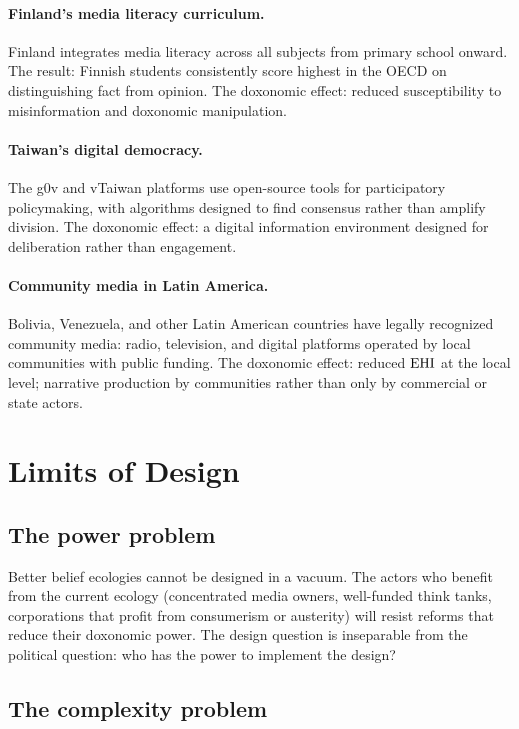 \paragraph{Finland's media literacy curriculum.}
Finland integrates media literacy across all subjects from primary school onward.
The result: Finnish students consistently score highest in the OECD on distinguishing fact from opinion.
The doxonomic effect: reduced susceptibility to misinformation and doxonomic manipulation.

\paragraph{Taiwan's digital democracy.}
The g0v and vTaiwan platforms use open-source tools for participatory policymaking, with algorithms designed to find consensus rather than amplify division.
The doxonomic effect: a digital information environment designed for deliberation rather than engagement.

\paragraph{Community media in Latin America.}
Bolivia, Venezuela, and other Latin American countries have legally recognized community media: radio, television, and digital platforms operated by local communities with public funding.
The doxonomic effect: reduced $\mathrm{EHI}$ at the local level; narrative production by communities rather than only by commercial or state actors.

\section{Limits of Design}
\label{sec:ch33-limits}

\subsection{The power problem}

Better belief ecologies cannot be designed in a vacuum.
The actors who benefit from the current ecology (concentrated media owners, well-funded think tanks, corporations that profit from consumerism or austerity) will resist reforms that reduce their doxonomic power.
The design question is inseparable from the political question: who has the power to implement the design?

\subsection{The complexity problem}

